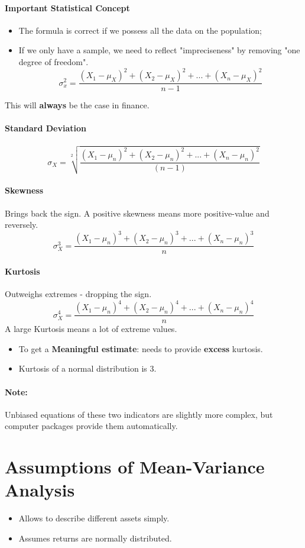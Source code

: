 \documentclass[11pt,a4paper]{report}
\begin{document}
\paragraph{Important Statistical Concept}
\begin{itemize}
    \item The formula is correct if we possess all the data on the population;
    \item If we only have a sample, we need to reflect "impreciseness" by removing "one degree of freedom".
    \[\sigma_x^2 = \frac{(X_1 - \mu_X)^2 + (X_2 - \mu_X)^2 + ... + (X_n - \mu_X)^2}{n-1}\]
\end{itemize}
This will \textbf{always} be the case in finance.

\paragraph{Standard Deviation}
\[\sigma_X = \sqrt[2]{\frac{(X_1 - \mu_n)^2 + (X_2 - \mu_n)^2 + ... + (X_n - \mu_n)^2}{(n-1)}} \]

\paragraph{Skewness}
Brings back the sign. A positive skewness means more positive-value and reversely.
\[\sigma_X^3 = \frac{(X_1 - \mu_n)^3 + (X_2 - \mu_n)^3 + ... + (X_n - \mu_n)^3}{n} \]

\paragraph*{Kurtosis}
Outweighs extremes - dropping the sign.
\[\sigma_X^4 = \frac{(X_1 - \mu_n)^4 + (X_2 - \mu_n)^4 + ... + (X_n - \mu_n)^4}{n} \]
A large Kurtosis means a lot of extreme values.
\begin{itemize}
    \item To get a \textbf{Meaningful estimate}: needs to provide \textbf{excess} kurtosis.
    \item Kurtosis of a normal distribution is 3.
\end{itemize}

\paragraph{Note:} Unbiased equations of these two indicators are slightly more complex, but computer packages provide them automatically.

\section{Assumptions of Mean-Variance Analysis}
\begin{itemize}
    \item Allows to describe different assets simply.
    \item Assumes returns are normally distributed.
\end{itemize}
\end{document}
